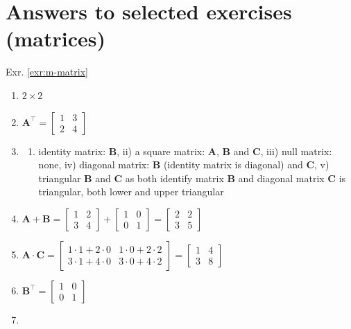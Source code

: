 \documentclass[
]{book}
\providecommand{\tightlist}{%
  \setlength{\itemsep}{0pt}\setlength{\parskip}{0pt}}
\theoremstyle{definition}
\theoremstyle{definition}
\theoremstyle{definition}
\theoremstyle{remark}
\begin{document}
\hypertarget{answers-to-selected-exercises-matrices}{%
\section*{Answers to selected exercises (matrices)}\label{answers-to-selected-exercises-matrices}}

Exr. \ref{exr:m-matrix}

\begin{enumerate}
\def\labelenumi{\alph{enumi})}
\item
  \(2 \times 2\)
\item
  \(\mathbf{A}^\top = \begin{bmatrix}  1 & 3 \\  2 & 4  \end{bmatrix}\)
\item
  \begin{enumerate}
  \def\labelenumii{\roman{enumii})}
  \tightlist
  \item
    identity matrix: \(\mathbf{B}\), ii) a square matrix: \(\mathbf{A}\), \(\mathbf{B}\) and \(\mathbf{C}\), iii) null matrix: none, iv) diagonal matrix: \(\mathbf{B}\) (identity matrix is diagonal) and \(\mathbf{C}\), v) triangular \(\mathbf{B}\) and \(\mathbf{C}\) as both identify matrix \(\mathbf{B}\) and diagonal matrix \(\mathbf{C}\) is triangular, both lower and upper triangular
  \end{enumerate}
\item
  \(\mathbf{A} + \mathbf{B} = \begin{bmatrix}  1 & 2 \\  3 & 4  \end{bmatrix} + \begin{bmatrix}  1 & 0 \\  0 & 1  \end{bmatrix} = \begin{bmatrix}  2 & 2 \\  3 & 5  \end{bmatrix}\)
\item
  \(\mathbf{A} \cdot \mathbf{C} = \begin{bmatrix}  1 \cdot 1 + 2 \cdot 0 & 1 \cdot 0 + 2 \cdot 2 \\  3 \cdot 1 + 4 \cdot 0 & 3 \cdot 0 + 4 \cdot 2  \end{bmatrix} = \begin{bmatrix}  1 & 4 \\  3 & 8  \end{bmatrix}\)
\item
  \(\mathbf{B}^\top = \begin{bmatrix}  1 & 0 \\  0 & 1  \end{bmatrix}\)
\item
\end{enumerate}
\end{document}
